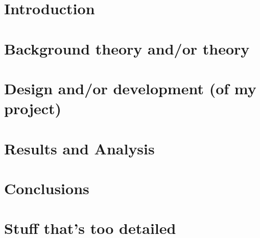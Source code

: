 \documentclass[12pt,a4paper]{report}
\begin{document}
\tableofcontents
\listoftables
\listoffigures


\chapter{Introduction}

\chapter{Background theory and/or theory}

\chapter{Design and/or development (of my project)}

\chapter{Results and Analysis}
\chapter{Conclusions}
\appendix
\chapter{Stuff that's too detailed}

\end{document}

